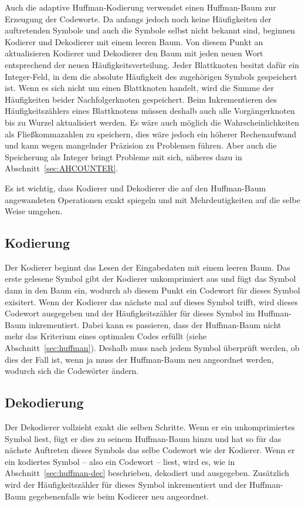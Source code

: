 \documentclass[twoside,11pt,a4paper]{article}
\theoremstyle{break}
\begin{document}
Auch die adaptive Huffman-Kodierung verwendet einen Huffman-Baum zur
Erzeugung der Codeworte. Da anfangs jedoch noch keine Häufigkeiten der
auftretenden Symbole und auch die Symbole selbst nicht bekannt sind,
beginnen Kodierer und Dekodierer mit einem leeren Baum. Von diesem
Punkt an aktualisieren Kodierer und Dekodierer den Baum mit jeden
neuen Wort entsprechend der neuen Häufigkeitsverteilung. Jeder
Blattknoten besitzt dafür ein Integer-Feld, in dem die absolute
Häufigkeit des zugehörigen Symbols gespeichert ist. Wenn es sich nicht
um einen Blattknoten handelt, wird die Summe der Häufigkeiten beider
Nachfolgerknoten gespeichert. Beim Inkrementieren des
Häufigkeitszählers eines Blattknotens müssen deshalb auch alle
Vorgängerknoten bis zu Wurzel aktualisiert werden. Es wäre auch
möglich die Wahrscheinlichkeiten als Fließkommazahlen zu speichern,
dies wäre jedoch ein höherer Rechenaufwand und kann wegen mangelnder
Präzision zu Problemen führen. Aber auch die Speicherung als Integer bringt
Probleme mit sich, näheres dazu in Abschnitt~\ref{sec:AHCOUNTER}.

Es ist wichtig, dass Kodierer und Dekodierer die auf den Huffman-Baum
angewandeten Operationen exakt spiegeln und mit Mehrdeutigkeiten auf
die selbe Weise umgehen.


\subsection{Kodierung}

Der Kodierer beginnt das Lesen der Eingabedaten mit einem leeren
Baum. Das erste gelesene Symbol gibt der Kodierer unkomprimiert aus
und fügt das Symbol dann in den Baum ein, wodurch ab diesem Punkt ein
Codewort für dieses Symbol exisitert. Wenn der Kodierer das nächste
mal auf dieses Symbol trifft, wird dieses Codewort ausgegeben und der
Häufigkeitszähler für dieses Symbol im Huffman-Baum inkrementiert.
Dabei kann es passieren, dass der Huffman-Baum nicht mehr das
Kriterium eines optimalen Codes erfüllt (siehe
Abschnitt~\ref{sec:huffman}).  Deshalb muss nach jedem Symbol
überprüft werden, ob dies der Fall ist, wenn ja muss der Huffman-Baum
neu angeordnet werden, wodurch sich die Codewörter ändern.

\subsection{Dekodierung}

Der Dekodierer vollzieht exakt die selben Schritte. Wenn er ein
unkomprimiertes Symbol liest, fügt er dies zu seinem Huffman-Baum
hinzu und hat so für das nächste Auftreten dieses Symbols das selbe
Codewort wie der Kodierer. Wenn er ein kodiertes Symbol -- also ein
Codewort -- liest, wird es, wie in Abschnitt~\ref{sec:huffman-dec}
beschrieben, dekodiert und ausgegeben. Zusätzlich wird der
Häufigkeitszähler für dieses Symbol inkrementiert und der Huffman-Baum
gegebenenfalls wie beim Kodierer neu angeordnet.
\end{document}

